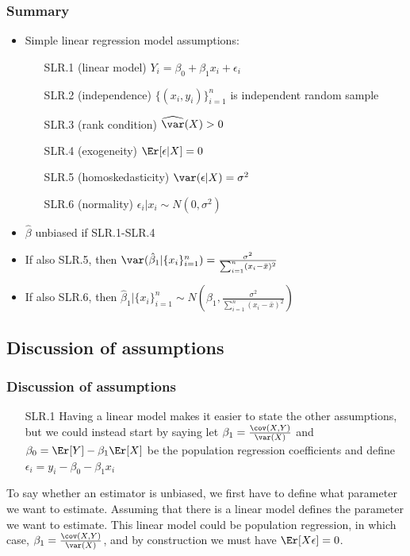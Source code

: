 \begin{frame} \frametitle{Summary}
  \begin{itemize}
  \item Simple linear regression model assumptions:
    \begin{enumerate}
    \item[SLR.1] (linear model) $ Y_i = \beta_0 + \beta_1 x_i + \epsilon_i $
    \item[SLR.2] (independence) $\{(x_i,y_i)\}_{i=1}^n$ is independent random
      sample
    \item[SLR.3] (rank condition) $\widehat{\var}(X) > 0$
    \item[SLR.4] (exogeneity) $\Er[\epsilon | X] = 0$
    \item[SLR.5] (homoskedasticity) $\var(\epsilon | X) =
      \sigma^2$
    \item[SLR.6] (normality) $\epsilon_i|x_i \sim N(0,\sigma^2)$
    \end{enumerate}
  \item $\hat{\beta}$ unbiased if SLR.1-SLR.4
  \item If also SLR.5, then $\var(\hat{\beta}_1 | \{x_i\}_{i=1}^n ) =
    \frac{\sigma^2}{\sum_{i=1}^n (x_i - \bar{x})^2}$ 
  \item If also SLR.6, then $\hat{\beta}_1|\{x_i\}_{i=1}^n \sim
    N\left(\beta_1, \frac{\sigma^2}{\sum_{i=1}^n (x_i - \bar{x})^2}
    \right)$
  \end{itemize}
\end{frame}

\subsection{Discussion of assumptions}
\begin{frame}[allowframebreaks]
  \frametitle{Discussion of assumptions}
  \begin{itemize}
  \item[SLR.1] Having a linear model makes it easier to state the other
    assumptions, but we could instead start by saying let $\beta_1 =
    \frac{\cov(X,Y)}{\var(X)}$ and $\beta_0 = \Er[Y] - \beta_1 \Er[X]$
    be the population regression coefficients and define $\epsilon_i =
    y_i - \beta_0 - \beta_1 x_i$
  \end{itemize}
\end{frame}

To say whether an estimator is unbiased, we first have to define what
parameter we want to estimate. Assuming that there is a linear model
defines the parameter we want to estimate. This linear model could be
population regression, in which case, $\beta_1 = \frac{\cov(X,Y)
}{\var(X)}$, and by construction we must have
$\Er[X\epsilon]=0$. 

